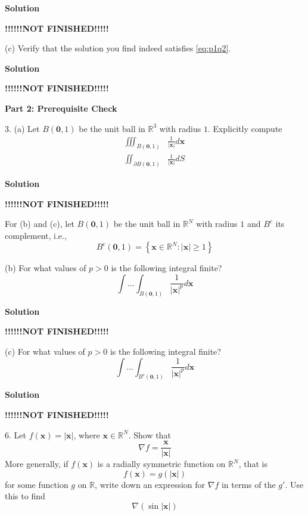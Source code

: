 \documentclass{article}
\begin{document}
\textbf{Solution}

\quad \textbf{!!!!!!NOT FINISHED!!!!!}

\vspace{5mm}
(c) Verify that the solution you find indeed satisfies \eqref{eq:p1q2}.

\textbf{Solution}

\quad \textbf{!!!!!!NOT FINISHED!!!!!}

\vspace{5mm}
\textbf{Part 2: Prerequisite Check}

3. (a) Let $B(\mathbf{0},1)$ be the unit ball in $\mathbb{R}^{3}$ with
   radius $1$. Explicitly compute
%
\begin{align}
    \iiint_{B(\mathbf{0},1)} &\frac{1}{|\mathbf{x}|} d \mathbf{x}
    \label{eq:p2q3a1} \\
    \iint_{\partial B(\mathbf{0},1)} &\frac{1}{|\mathbf{x}|} d S
    \label{eq:p2q3a2}
\end{align}

\textbf{Solution}

\quad \textbf{!!!!!!NOT FINISHED!!!!!}

\vspace{5mm}
For (b) and (c), let $B(\mathbf{0},1)$ be the unit ball in
$\mathbb{R}^{N}$ with radius $1$ and $B^{c}$ its complement, i.e.,
$$B^{c}(\mathbf{0}, 1) = \left\{\mathbf{x} \in \mathbb{R}^{N}: |\mathbf{x}| \geq 1 \right\}$$

(b) For what values of $p > 0$ is the following integral finite?
%
\begin{equation}
    \int \ldots \int_{B(\mathbf{0}, 1)} \frac{1}{|\mathbf{x}|^{p}} d \mathbf{x}
    \label{eq:p2q3b}
\end{equation}

\textbf{Solution}

\quad \textbf{!!!!!!NOT FINISHED!!!!!}

\vspace{5mm}
(c) For what values of $p > 0$ is the following integral finite?
%
\begin{equation}
    \int \ldots \int_{B^{c}(\mathbf{0}, 1)} \frac{1}{|\mathbf{x}|^{p}} d \mathbf{x}
    \label{eq:p2q3c}
\end{equation}

\textbf{Solution}

\quad \textbf{!!!!!!NOT FINISHED!!!!!}

\vspace{5mm}
6. Let $f(\mathbf{x}) = |\mathbf{x}|$, where $\mathbf{x} \in \mathbb{R}^{N}$.
Show that $$\nabla f = \frac{\mathbf{x}}{|\mathbf{x}|}$$ More generally,
if $f(\mathbf{x})$ is a radially symmetric function on $\mathbb{R}^{N}$,
that is $$f(\mathbf{x}) = g(|\mathbf{x}|)$$ for some function $g$ on
$\mathbb{R}$, write down an expression for $\nabla f$ in terms of the $g'$.
Use this to find $$\nabla(\sin |\mathbf{x}|)$$
\end{document}
